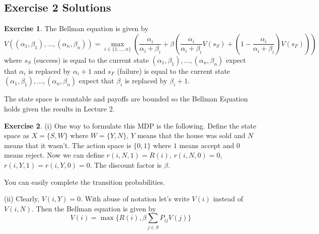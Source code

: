 \documentclass[letter,11pt]{article}
\begin{document}
\subsection{Exercise 2 Solutions}

\textbf{Exercise 1}. The Bellman equation is given by 
$$V((\alpha_{1},\beta_{1}),\ldots,(\alpha_{n},\beta_{n})) = \max _{i \in \{1,\ldots,n \}  } \left ( \frac{ \alpha_{i} } {\alpha _{i} + \beta_{i} } + \beta  \left (  \frac{ \alpha_{i} } {\alpha _{i} + \beta_{i} } V (s_{S}) + \left (1-  \frac{ \alpha_{i} } {\alpha _{i} + \beta_{i} } \right )V (s_{F} ) \right ) \right ) $$
where $s_{S} $ (success) is equal to the current state  $(\alpha_{1},\beta_{1}),\ldots,(\alpha_{n},\beta_{n})$ expect that $\alpha_{i}$ is replaced by $\alpha_{i}+1$ and $s_{F} $ (failure) is equal to the current state  $(\alpha_{1},\beta_{1}),\ldots,(\alpha_{n},\beta_{n})$ expect that $\beta_{i}$ is replaced by $\beta_{i}+1$.


The state space is countable and payoffs are bounded so the Bellman Equation holds given the results in Lecture 2. 




\textbf{Exercise 2}.
(i) One way to formulate this MDP is the following. Define the state space as $X = \{S, W \}$ where $W = \{Y,N \}$, $Y$ means that the house was sold and $N$ means that it wasn't. The action space is $\{0,1\}$ where $1$ means accept and $0$ means reject. Now we can define $r(i,N,1) = R(i)$,  $r(i,N,0) = 0$, $r(i,Y,1) = r(i,Y,0) = 0$. The discount factor is $\beta$.

You can easily complete the transition probabilities.


(ii)  Clearly, $V(i,Y)=0$. With abuse of notation let's write $V(i)$ instead of $V(i,N)$. Then the Bellman equation is given by
$$ V(i) = \max \{R(i) , \beta \sum_{j \in S} P_{ij} V(j) \}$$
\end{document}
